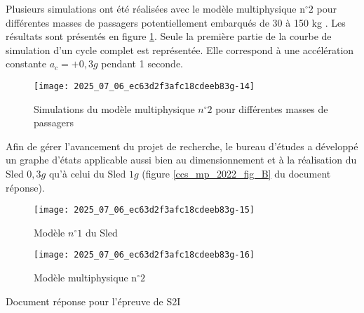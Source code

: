 Plusieurs simulations ont été réalisées avec le modèle multiphysique $\mathrm{n}^{\circ} 2$ pour différentes masses de passagers potentiellement embarqués de 30 à 150 kg . Les résultats sont présentés en figure \ref{ccs_mp_2022_fig_19}. Seule la première partie de la courbe de simulation d'un cycle complet est représentée. Elle correspond à une accélération constante $a_{c}=+0,3 g$ pendant 1 seconde.

\begin{figure}[!h]
\centering
\texttt{[image: 2025\_07\_06\_ec63d2f3afc18cdeeb83g-14]}

\caption{\label{ccs_mp_2022_fig_19}Simulations du modèle multiphysique $n^{\circ} 2$ pour différentes masses de passagers}
\end{figure}


Afin de gérer l'avancement du projet de recherche, le bureau d'études a développé un graphe d'états applicable aussi bien au dimensionnement et à la réalisation du Sled $0,3 g$ qu'à celui du Sled $1 g$ (figure \ref{ccs_mp_2022_fig_B} du document réponse).


\begin{figure}[!h]
\centering

\texttt{[image: 2025\_07\_06\_ec63d2f3afc18cdeeb83g-15]}
\caption{\label{ccs_mp_2022_fig_20}Modèle $n^{\circ} 1$ du Sled}
\end{figure}


\begin{figure}[!h]
\centering
\texttt{[image: 2025\_07\_06\_ec63d2f3afc18cdeeb83g-16]}

\caption{\label{ccs_mp_2022_fig_21}Modèle multiphysique $\mathrm{n}^{\circ} 2$}
\end{figure}




Document réponse pour l'épreuve de S2I\\

